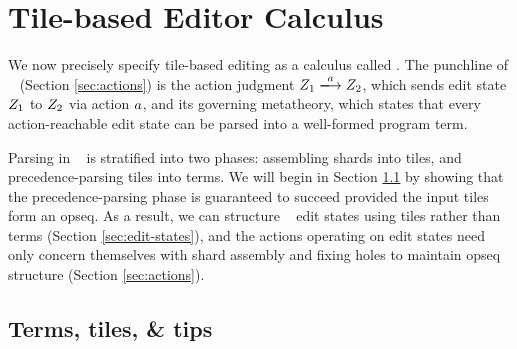 
\section{Tile-based Editor Calculus}\label{sec:formalism}

We now precisely specify tile-based editing
as a calculus called \ty.
The punchline of \ty~ (Section \ref{sec:actions})
is the action judgment
$\performAction{\editState_1}{\action}{\editState_2}$,
which sends edit state $Z_1$ to $Z_2$
via action $a$, and its governing metatheory,
which states that every action-reachable edit state
can be parsed into a well-formed program term.

Parsing in \ty~ is stratified into two phases:
assembling shards into tiles, and precedence-parsing
tiles into terms.
We will begin in Section \ref{sec:terms-tiles-tips}
by showing that the precedence-parsing phase is
guaranteed to succeed provided the input tiles form
an opseq.
As a result, we can structure \ty~ edit states using
tiles rather than terms (Section \ref{sec:edit-states}),
and the actions operating on edit states need only
concern themselves with shard assembly and fixing holes
to maintain opseq structure (Section \ref{sec:actions}).






\subsection{Terms, tiles, \& tips} \label{sec:terms-tiles-tips}

